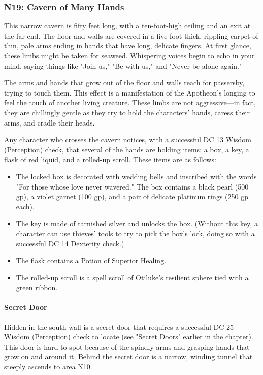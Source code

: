 \documentclass[10pt,a4paper,twoside,twocolumn,openany,nodeprecatedcode]{dndbook}
\begin{document}
\subsubsection{N19: Cavern of Many Hands}
\begin{DndReadAloud}{}
This narrow cavern is fifty feet long, with a ten-foot-high ceiling and an exit at the far end. The floor and walls are covered in a five-foot-thick, rippling carpet of thin, pale arms ending in hands that have long, delicate fingers. At first glance, these limbs might be taken for seaweed. Whispering voices begin to echo in your mind, saying things like "Join us," "Be with us," and "Never be alone again."

\end{DndReadAloud}

The arms and hands that grow out of the floor and walls reach for passersby, trying to touch them. This effect is a manifestation of the Apotheon's longing to feel the touch of another living creature. These limbs are not aggressive—in fact, they are chillingly gentle as they try to hold the characters' hands, caress their arms, and cradle their heads.

Any character who crosses the cavern notices, with a successful DC 13 Wisdom (Perception) check, that several of the hands are holding items: a box, a key, a flask of red liquid, and a rolled-up scroll. These items are as follows:


\begin{itemize}
\item The locked box is decorated with wedding bells and inscribed with the words "For those whose love never wavered." The box contains a black pearl (500 gp), a violet garnet (100 gp), and a pair of delicate platinum rings (250 gp each).
\item The key is made of tarnished silver and unlocks the box. (Without this key, a character can use thieves' tools to try to pick the box's lock, doing so with a successful DC 14 Dexterity check.)
\item The flask contains a Potion of Superior Healing.
\item The rolled-up scroll is a spell scroll of Otiluke's resilient sphere tied with a green ribbon.
\end{itemize}

\paragraph{Secret Door}
Hidden in the south wall is a secret door that requires a successful DC 25 Wisdom (Perception) check to locate (see "Secret Doors" earlier in the chapter). This door is hard to spot because of the spindly arms and grasping hands that grow on and around it. Behind the secret door is a narrow, winding tunnel that steeply ascends to area N10.
\end{document}
